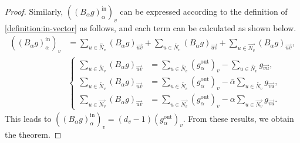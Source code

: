 \documentclass{article}
\theoremstyle{plain}
\begin{document}
\begin{proof}
	Similarly, $( \left( B_{\alpha} g \right)_{\alpha}^{\text{in}} )_{v}$ can be expressed according to the definition of \eqref{definition:in-vector} as follows,
	and each term can be calculated as shown below.
	\begin{align*}
		\left( \left( B_{\alpha} g \right)_{\alpha}^{\text{in}} \right)_{v} & =
		\sum_{u \in \overleftrightarrow{N_v}} \left( B_{\alpha} g \right)_{\overrightarrow{uv}}
		+ \sum_{u \in \overleftarrow{N_v}} \left( B_{\alpha} g \right)_{\overrightarrow{uv}}
		+ \sum_{u \in \overrightarrow{N_v}} \left( B_{\alpha} g \right)_{\overrightarrow{uv}}
		,                                                                                                                                                                                        \\
		                                                                    & \left\{\begin{aligned}
			                                                                             \sum_{u \in \overleftrightarrow{N_v}} \left( B_{\alpha} g \right)_{\overrightarrow{uv}} & =
			                                                                             \sum_{u \in \overleftrightarrow{N_v}} \left( g_{\alpha}^{\text{out}} \right)_{v}
			                                                                             - \sum_{u \in \overleftrightarrow{N_v}} g_{\overrightarrow{vu}}
			                                                                             ,                                                                                           \\
			                                                                             \sum_{u \in \overleftarrow{N_v}} \left( B_{\alpha} g \right)_{\overrightarrow{uv}}      & =
			                                                                             \sum_{u \in \overleftarrow{N_v}} \left( g_{\alpha}^{\text{out}} \right)_{v}
			                                                                             - \bar{\alpha} \sum_{u \in \overleftarrow{N_v}} g_{\overrightarrow{vu}}
			                                                                             ,                                                                                           \\
			                                                                             \sum_{u \in \overrightarrow{N_v}} \left( B_{\alpha} g \right)_{\overrightarrow{uv}}     & =
			                                                                             \sum_{u \in \overrightarrow{N_v}} \left( g_{\alpha}^{\text{out}} \right)_{v}
			                                                                             - \alpha \sum_{u \in \overrightarrow{N_v}} g_{\overrightarrow{vu}}
			                                                                             .
		                                                                             \end{aligned}\right.
	\end{align*}
	This leads to $( \left( B_{\alpha} g \right)_{\alpha}^{\text{in}} )_{v} = (d_v - 1) ( g_{\alpha}^{\text{out}} )_{v}$. From these results, we obtain the theorem.
\end{proof}
\end{document}
